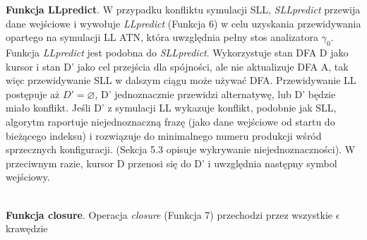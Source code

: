 \par
\textbf{Funkcja LLpredict}. W przypadku konfliktu symulacji SLL, \textit{SLLpredict} przewija
dane wejściowe i wywołuje \textit{LLpredict} (Funkcja 6) w celu uzyskania przewidywania
opartego na symulacji LL ATN, która uwzględnia pełny stos analizatora $\gamma_0$.
Funkcja \textit{LLpredict} jest podobna do \textit{SLLpredict}.
Wykorzystuje stan DFA D jako kursor i stan D' jako cel przejścia dla spójności,
ale nie aktualizuje DFA A, tak więc przewidywanie SLL w dalszym ciągu może używać DFA.
Przewidywanie LL postępuje aż $D' = \varnothing $, D' jednoznacznie przewidzi alternatywę,
lub D' będzie miało konflikt.
Jeśli D' z symulacji LL wykazuje konflikt, podobnie jak SLL, algorytm raportuje niejednoznaczną frazę
(jako dane wejściowe od startu do bieżącego indeksu) i rozwiązuje do minimalnego numeru
produkcji wśród sprzecznych konfiguracji.
(Sekcja 5.3 opisuje wykrywanie niejednoznaczności). W przeciwnym razie, kursor D przenosi się
do D' i uwzględnia następny symbol wejściowy.
\\
 \\
\par
\textbf{Funkcja closure}. Operacja \textit{closure} (Funkcja 7) przechodzi przez wszystkie $\epsilon$ krawędzie
